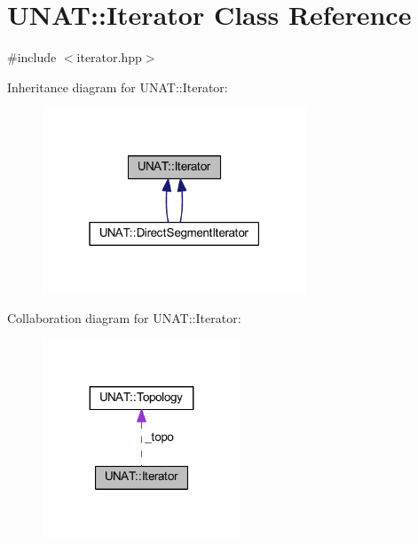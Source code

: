 \hypertarget{classUNAT_1_1Iterator}{}\section{U\+N\+AT\+::Iterator Class Reference}
\label{classUNAT_1_1Iterator}


{\ttfamily \#include $<$iterator.\+hpp$>$}



Inheritance diagram for U\+N\+AT\+::Iterator\+:
\nopagebreak
\begin{figure}[H]
\begin{center}
\leavevmode
\includegraphics[width=223pt]{classUNAT_1_1Iterator__inherit__graph}
\end{center}
\end{figure}


Collaboration diagram for U\+N\+AT\+::Iterator\+:
\nopagebreak
\begin{figure}[H]
\begin{center}
\leavevmode
\includegraphics[width=167pt]{classUNAT_1_1Iterator__coll__graph}
\end{center}
\end{figure}
